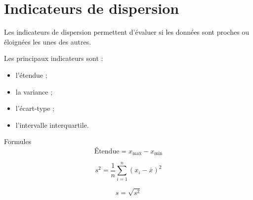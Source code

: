 \section{Indicateurs de dispersion}

\begin{cadretheorie}
Les indicateurs de dispersion permettent d’évaluer si les données sont proches ou éloignées les unes des autres.

Les principaux indicateurs sont :
\begin{itemize}
    \item l’étendue ;
    \item la variance ;
    \item l’écart-type ;
    \item l’intervalle interquartile.
\end{itemize}
\end{cadretheorie}

\begin{cadrevert}{Formules}
\[
\text{Étendue}=x_{\max}-x_{\min}
\]

\[
s^2=\frac{1}{n}\sum_{i=1}^{n}(x_i-\bar{x})^2
\]

\[
s=\sqrt{s^2}
\]
\end{cadrevert}